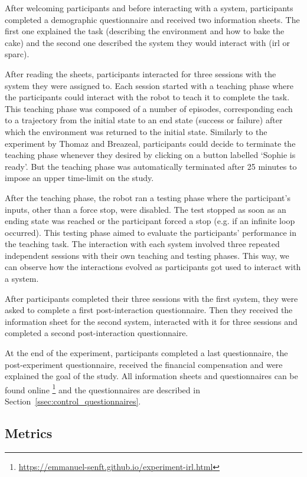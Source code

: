 After welcoming participants and before interacting with a system, participants completed a demographic questionnaire and received two information sheets. The first one explained the task (describing the environment and how to bake the cake) and the second one described the system they would interact with (\gls{irl} or \gls{sparc}). 

After reading the sheets, participants interacted for three sessions with the system they were assigned to. Each session started with a teaching phase where the participants could interact with the robot to teach it to complete the task. This teaching phase was composed of a number of episodes, corresponding each to a trajectory from the initial state to an end state (success or failure) after which the environment was returned to the initial state. Similarly to the experiment by Thomaz and Breazeal, participants could decide to terminate the teaching phase whenever they desired by clicking on a button labelled `Sophie is ready'. But the teaching phase was automatically terminated after 25 minutes to impose an upper time-limit on the study. 

After the teaching phase, the robot ran a testing phase where the participant's inputs, other than a force stop, were disabled. The test stopped as soon as an ending state was reached or the participant forced a stop (e.g. if an infinite loop occurred). This testing phase aimed to evaluate the participants' performance in the teaching task. The interaction with each system involved three repeated independent sessions with their own teaching and testing phases. This way, we can observe how the interactions evolved as participants got used to interact with a system.

After participants completed their three sessions with the first system, they were asked to complete a first post-interaction questionnaire. Then they received the information sheet for the second system, interacted with it for three sessions and completed a second post-interaction questionnaire.

At the end of the experiment, participants completed a last questionnaire, the post-experiment questionnaire, received the financial compensation and were explained the goal of the study. All information sheets and questionnaires can be found online \footnote{\url{https://emmanuel-senft.github.io/experiment-irl.html}} and the questionnaires are described in Section~\ref{ssec:control_questionnaires}.

\subsection{Metrics}

